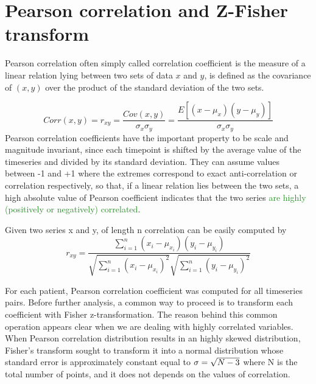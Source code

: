\documentclass[11pt]{report}
\begin{document}
\section{Pearson correlation and Z-Fisher transform}
Pearson correlation often simply called correlation coefficient is the measure of a linear relation lying between two sets of data $x$ and $y$, is defined as the covariance of $(x, y)$ over the product of the standard deviation of the two sets.

\begin{equation}
Corr(x, y) = r_{xy}=  \frac{Cov\left( x, y\right)}{\sigma_x \sigma_y} = \frac{E\left[ \left( x - \mu_x \right) \left( y - \mu_y \right)\right]}{\sigma_{x} \sigma_{y}}
\end{equation}
Pearson correlation coefficients have the important property to be scale and magnitude invariant, since each timepoint is shifted by the average value of the timeseries and divided by its standard deviation.
They can assume values between -1 and +1 where the extremes correspond to exact anti-correlation or correlation respectively, so that, if a linear relation lies between the two sets, a high absolute value of Pearson coefficient indicates that the two series \textcolor{ForestGreen}{are highly  (positively or negatively) correlated}.
\cite{baldini2021}

Given two series x and y, of length n correlation can be easily computed by
\begin{equation}
r_{xy} = \frac{\sum_{i = 1}^n \left( x_i - \mu_{x_i}\right)\left( y_i - \mu_{y_i}\right)}{\sqrt{\sum_{i = 1}^n \left( x_i -\mu_{x_i}\right)^2}\sqrt{\sum_{i = 1}^n \left( y_i -\mu_{y_i}\right)^2}}
\end{equation}

For each patient, Pearson correlation coefficient was computed for all timeseries pairs.
Before further analysis, a common way to proceed is to transform each coefficient with Fisher z-transformation.\cite{spera-2019}
The reason behind this common operation appears clear when we are dealing with highly correlated variables.
When Pearson correlation distribution results in an highly skewed distribution, Fisher's transform sought to transform it into a normal distribution whose standard error is approximately constant equal to $\sigma = \/\sqrt{N-3}$ where N is the total number of points, and it does not depends on the values of correlation.\cite{wicklin2017}
\end{document}
